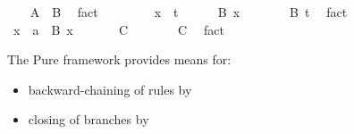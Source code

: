 \begin{isabellebody}
\isanewline
\ \ \isamarkupfalse%
\ {}A\ {}\ B{}\ \isamarkupfalse%
\ fact\isanewline
\isanewline
{}\isamarkupfalse%
\isanewline
\isanewline
\ \ \isamarkupfalse%
\isanewline
\ \ \ \ \isamarkupfalse%
\ x\ {}\ t\isanewline
\ \ \ \ \isamarkupfalse%
\ {}B\ x{}\ \isamarkupfalse%
\isanewline
\ \ \isamarkupfalse%
\isanewline
\ \ \isamarkupfalse%
\ {}B\ t{}\ \isamarkupfalse%
\ fact\isanewline
\isanewline
{}\isamarkupfalse%
\isanewline
\isanewline
\ \ \isamarkupfalse%
\isanewline
\ \ \ \ \isamarkupfalse%
\ x\ {}{}\ {}a\ \ {}B\ x{}\ \isamarkupfalse%
\isanewline
\ \ \ \ \isamarkupfalse%
\ C\ \isamarkupfalse%
\isanewline
\ \ \isamarkupfalse%
\isanewline
\ \ \isamarkupfalse%
\ C\ \isamarkupfalse%
\ fact%
\endisatagproof
{\isafoldproof}%
%
\isadelimproof
\isanewline
%
\endisadelimproof
\isanewline
{}\isamarkupfalse%
%
\isamarkuptrue%
%
\begin{isamarkuptext}%
The Pure framework provides means for:

  \begin{itemize}

    \item backward-chaining of rules by \hyperlink{inference.resolution}{\mbox{}}

    \item closing of branches by \hyperlink{inference.assumption}{\mbox{}}

  \end{itemize}


\end{isamarkuptext}
\end{isabellebody}

